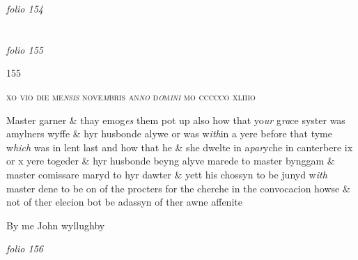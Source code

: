 \documentclass[12pt, a4paper]{book}
\begin{document}
\dotfill
						\newpage
{}

\textit{folio 154}


         \vspace*{4cm}
         
\dotfill
						  \section*{}  \subsection*{}

\textit{folio 155}



\begin{flushright}{\color{Mahogany}155}\end{flushright}
 
				\begin{center} \begin{large} {\scshape xo vio die me\textit{nsis} nove\textit{m}bris an\textit{no }d\textit{o}m\textit{ini} mo ccccco xliiio} \end{large} \end{center}
			

		\ifthenelse{\isodd{\thepage}}
		{\reversemarginpar}
		{\normalmarginpar}
		Master garner \& thay emog\textit{es} them pot up also how that
 yo\textit{ur} g\textit{ra}ce syster was amylners wyffe \& hyr husbonde alywe
 or was w\textit{ith}in a yere before that tyme w\textit{hich} was in lent last
			 and how that he
	\& she dwelte in a\textit{par}yche in canterbere ix or x yere
 togeder \& hyr husbonde beyng alyve marede to
	master bynggam \& master comissare maryd to hyr
 dawter \& yett his chossyn to be junyd w\textit{ith} master
 dene to be on of the procters for the cherche
 in the convocacion howse \& not of ther elecion
 bot be adassyn of ther awne affenite
			
 
		\ifthenelse{\isodd{\thepage}}
		{\reversemarginpar}
		{\normalmarginpar}
		By me John wyllughby

\dotfill
						\newpage
{}

\textit{folio 156}
\end{document}
